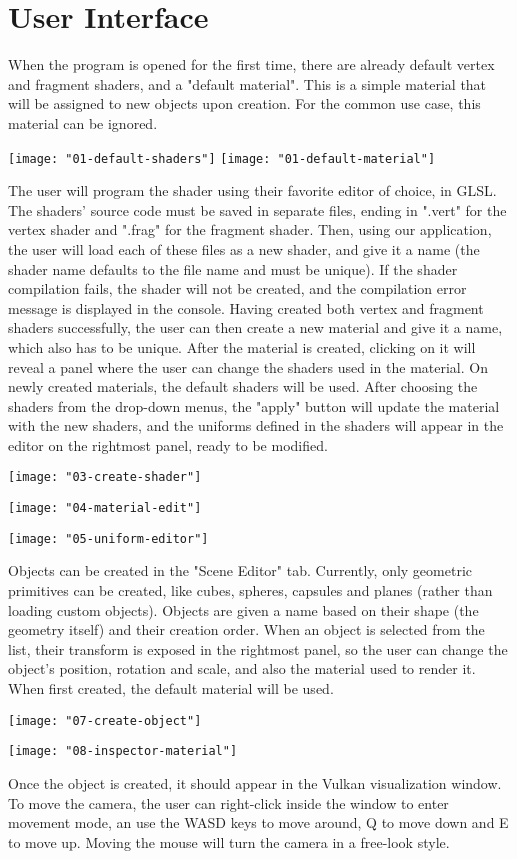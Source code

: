 \section{User Interface}
When the program is opened for the first time, there are already default vertex and fragment shaders, and a "default material". This is a simple material that will be assigned to new objects upon creation. For the common use case, this material can be ignored.

\texttt{[image: "01-default-shaders"]}
\texttt{[image: "01-default-material"]}

The user will program the shader using their favorite editor of choice, in GLSL. The shaders' source code must be saved in separate files, ending in ".vert" for the vertex shader and ".frag" for the fragment shader. Then, using our application, the user will load each of these files as a new shader, and give it a name (the shader name defaults to the file name and must be unique). If the shader compilation fails, the shader will not be created, and the compilation error message is displayed in the console. Having created both vertex and fragment shaders successfully, the user can then create a new material and give it a name, which also has to be unique. After the material is created, clicking on it will reveal a panel where the user can change the shaders used in the material. On newly created materials, the default shaders will be used. After choosing the shaders from the drop-down menus, the "apply" button will update the material with the new shaders, and the uniforms defined in the shaders will appear in the editor on the rightmost panel, ready to be modified.

\texttt{[image: "03-create-shader"]}

\texttt{[image: "04-material-edit"]}

\texttt{[image: "05-uniform-editor"]}

Objects can be created in the "Scene Editor" tab. Currently, only geometric primitives can be created, like cubes, spheres, capsules and planes (rather than loading custom objects). Objects are given a name based on their shape (the geometry itself) and their creation order. When an object is selected from the list, their transform is exposed in the rightmost panel, so the user can change the object's position, rotation and scale, and also the material used to render it. When first created, the default material will be used.

\texttt{[image: "07-create-object"]}

\texttt{[image: "08-inspector-material"]}

Once the object is created, it should appear in the Vulkan visualization window. To move the camera, the user can right-click inside the window to enter movement mode, an use the WASD keys to move around, Q to move down and E to move up. Moving the mouse will turn the camera in a free-look style.
